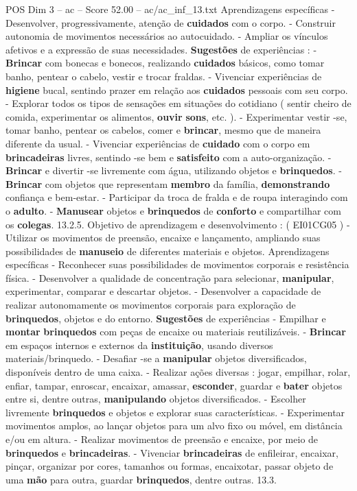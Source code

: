 \begin{textsample}{POS Dim 3 – ac – Score 52.00 – ac/ac\_inf\_13.txt}
Aprendizagens específicas - Desenvolver, progressivamente, atenção de \textbf{cuidados} com o corpo. - Construir autonomia de movimentos necessários ao autocuidado. - Ampliar os vínculos afetivos e a expressão de suas necessidades. \textbf{Sugestões} de experiências : - \textbf{Brincar} com bonecas e bonecos, realizando \textbf{cuidados} básicos, como tomar banho, pentear o cabelo, vestir e trocar fraldas. - Vivenciar experiências de \textbf{higiene} bucal, sentindo prazer em relação aos \textbf{cuidados} pessoais com seu corpo. - Explorar todos os tipos de sensações em situações do cotidiano ( sentir cheiro de comida, experimentar os alimentos, \textbf{ouvir} \textbf{sons}, etc. ). - Experimentar vestir -se, tomar banho, pentear os cabelos, comer e \textbf{brincar}, mesmo que de maneira diferente da usual. - Vivenciar experiências de \textbf{cuidado} com o corpo em \textbf{brincadeiras} livres, sentindo -se bem e \textbf{satisfeito} com a auto-organização. - \textbf{Brincar} e divertir -se livremente com água, utilizando objetos e \textbf{brinquedos}. - \textbf{Brincar} com objetos que representam \textbf{membro} da família, \textbf{demonstrando} confiança e bem-estar. - Participar da troca de fralda e de roupa interagindo com o \textbf{adulto}. - \textbf{Manusear} objetos e \textbf{brinquedos} de \textbf{conforto} e compartilhar com os \textbf{colegas}. 13.2.5.
Objetivo de aprendizagem e desenvolvimento : ( EI01CG05 ) - Utilizar os movimentos de preensão, encaixe e lançamento, ampliando suas possibilidades de \textbf{manuseio} de diferentes materiais e objetos.
Aprendizagens específicas - Reconhecer suas possibilidades de movimentos corporais e resistência física. - Desenvolver a qualidade de concentração para selecionar, \textbf{manipular}, experimentar, comparar e descartar objetos. - Desenvolver a capacidade de realizar autonomamente os movimentos corporais para exploração de \textbf{brinquedos}, objetos e do entorno. \textbf{Sugestões} de experiências - Empilhar e \textbf{montar} \textbf{brinquedos} com peças de encaixe ou materiais reutilizáveis. - \textbf{Brincar} em espaços internos e externos da \textbf{instituição}, usando diversos materiais/brinquedo. - Desafiar -se a \textbf{manipular} objetos diversificados, disponíveis dentro de uma caixa. - Realizar ações diversas : jogar, empilhar, rolar, enfiar, tampar, enroscar, encaixar, amassar, \textbf{esconder}, guardar e \textbf{bater} objetos entre si, dentre outras, \textbf{manipulando} objetos diversificados. - Escolher livremente \textbf{brinquedos} e objetos e explorar suas características. - Experimentar movimentos amplos, ao lançar objetos para um alvo fixo ou móvel, em distância e/ou em altura. - Realizar movimentos de preensão e encaixe, por meio de \textbf{brinquedos} e \textbf{brincadeiras}. - Vivenciar \textbf{brincadeiras} de enfileirar, encaixar, pinçar, organizar por cores, tamanhos ou formas, encaixotar, passar objeto de uma \textbf{mão} para outra, guardar \textbf{brinquedos}, dentre outras. 13.3.

\end{textsample}
